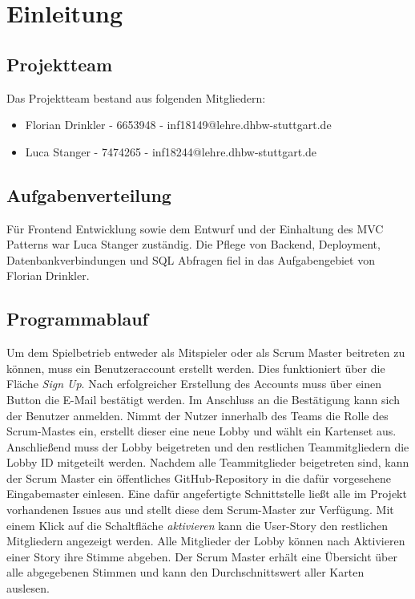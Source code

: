 
\chapter{Einleitung}\label{ch:einleitung}
\section{Projektteam}\label{sec:projektteam}
Das Projektteam bestand aus folgenden Mitgliedern:
\begin{itemize}
	\item Florian Drinkler - 6653948 - inf18149@lehre.dhbw-stuttgart.de
	\item Luca Stanger - 7474265 - inf18244@lehre.dhbw-stuttgart.de
\end{itemize}
\section{Aufgabenverteilung}\label{sec:aufgabenverteilung}
Für Frontend Entwicklung sowie dem Entwurf und der Einhaltung des MVC Patterns war Luca Stanger zuständig. Die Pflege von Backend, Deployment, Datenbankverbindungen und SQL Abfragen fiel in das Aufgabengebiet von Florian Drinkler. 
\section{Programmablauf}\label{sec:programmablauf}
Um dem Spielbetrieb entweder als Mitspieler oder als Scrum Master beitreten zu können, muss ein Benutzeraccount erstellt werden. Dies funktioniert über die Fläche \emph{Sign Up}. Nach erfolgreicher Erstellung des Accounts muss über einen Button die E-Mail bestätigt werden. Im Anschluss an die Bestätigung kann sich der Benutzer anmelden. Nimmt der Nutzer innerhalb des Teams die Rolle des Scrum-Mastes ein, erstellt dieser eine neue Lobby und wählt ein Kartenset aus. Anschließend muss der Lobby beigetreten und den restlichen Teammitgliedern die Lobby ID mitgeteilt werden. Nachdem alle Teammitglieder beigetreten sind, kann der Scrum Master ein öffentliches GitHub-Repository in die dafür vorgesehene Eingabemaster einlesen. Eine dafür angefertigte Schnittstelle ließt alle im Projekt vorhandenen Issues aus und stellt diese dem Scrum-Master zur Verfügung. Mit einem Klick auf die Schaltfläche \emph{aktivieren} kann die User-Story den restlichen Mitgliedern angezeigt werden. Alle Mitglieder der Lobby können nach Aktivieren einer Story ihre Stimme abgeben. Der Scrum Master erhält eine Übersicht über alle abgegebenen Stimmen und kann den Durchschnittswert aller Karten auslesen.